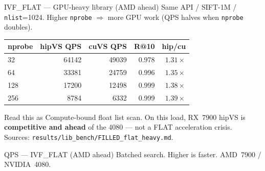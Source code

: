 \documentclass[aspectratio=169,11pt]{beamer}
\begin{document}
\begin{frame}{IVF\_FLAT --- GPU-heavy library (AMD ahead)}
  \footnotesize
  Same API / SIFT-1M / \texttt{nlist}=1024.
  Higher \texttt{nprobe} $\Rightarrow$ more GPU work (QPS halves when \texttt{nprobe} doubles).\\[0.3em]

  \begin{center}
  \begin{tabular}{@{}lrrrr@{}}
    \toprule
    \textbf{nprobe}
      & \textbf{hipVS QPS} & \textbf{cuVS QPS}
      & \textbf{R@10} & \textbf{hip/cu} \\
    \midrule
    32  & 64142 & 49039 & 0.978 & \textbf{$1.31\times$} \\
    64  & 33381 & 24759 & 0.996 & \textbf{$1.35\times$} \\
    128 & 17200 & 12498 & 0.999 & \textbf{$1.38\times$} \\
    256 & 8784  & 6332  & 0.999 & \textbf{$1.39\times$} \\
    \bottomrule
  \end{tabular}
  \end{center}

  \vspace{0.45em}
  \begin{block}{Read this as}
    \footnotesize
    Compute-bound float list scan. On this load, RX~7900 hipVS is
    \textbf{competitive and ahead} of the 4080 --- not a FLAT acceleration crisis.\\
    Sources: \texttt{results/lib\_bench/FILLED\_flat\_heavy.md}.
  \end{block}
\end{frame}

\begin{frame}{QPS --- IVF\_FLAT (AMD ahead)}
  \vspace{-0.2em}
  {\footnotesize Batched search. Higher is faster.
  {\color{red}AMD~7900} / {\color{green!60!black}NVIDIA~4080}.}\\[0.1em]
  \centering
\end{frame}
\end{document}
